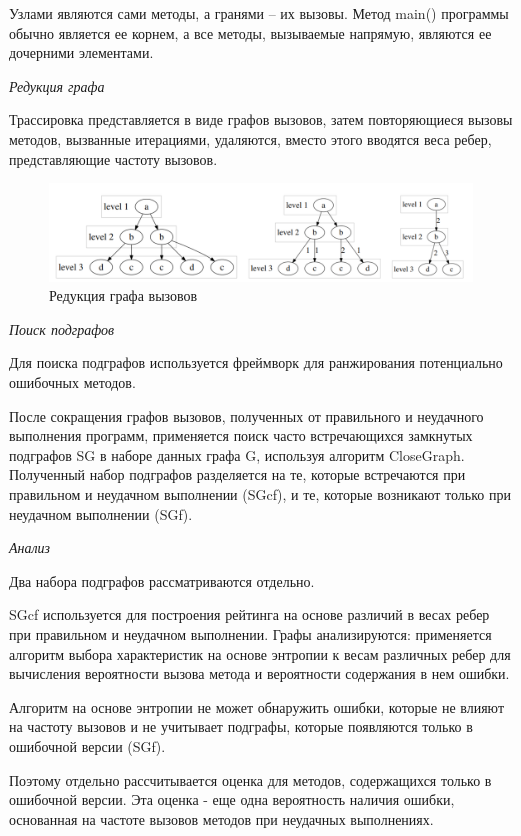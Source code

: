 Узлами являются сами методы, а гранями -- их вызовы. Метод main() программы обычно является ее корнем, а все методы, вызываемые напрямую, являются ее дочерними элементами.

\textit{Редукция графа}

Трассировка представляется в виде графов вызовов, затем повторяющиеся вызовы методов, вызванные итерациями, удаляются, вместо этого вводятся веса ребер, представляющие частоту вызовов. 

\begin{figure}[!ht]
	\centering
	\includegraphics[width=1\textwidth]{ResearchNotes/rndhpc_not_dbg_2021_11_10/reduction.png}
	\caption{Редукция графа вызовов} 
\end{figure}

\textit{Поиск подграфов}

Для поиска подграфов используется фреймворк для ранжирования потенциально ошибочных методов.

После сокращения графов вызовов, полученных от правильного и неудачного выполнения программ, применяется поиск часто встречающихся замкнутых подграфов SG в наборе данных графа G, используя алгоритм CloseGraph. Полученный набор подграфов разделяется на те, которые встречаются при правильном и неудачном выполнении (SGcf), и те, которые возникают только при неудачном выполнении (SGf).

\textit{Анализ}

Два набора подграфов рассматриваются отдельно.

SGcf используется для построения рейтинга на основе различий в весах ребер при правильном и неудачном выполнении. Графы анализируются: применяется алгоритм выбора характеристик на основе энтропии к весам различных ребер для вычисления вероятности вызова метода и вероятности содержания в нем ошибки.

Алгоритм на основе энтропии не может обнаружить ошибки, которые не влияют на частоту вызовов и не учитывает подграфы, которые появляются только в ошибочной версии (SGf).

Поэтому отдельно рассчитывается оценка для методов, содержащихся только в ошибочной версии. Эта оценка - еще одна вероятность наличия ошибки, основанная на частоте вызовов методов при неудачных выполнениях.

